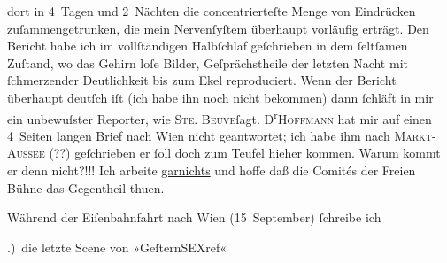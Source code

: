                dort in 4 Tagen und 2 Nächten die concentrierteſte Menge von Eindrücken
               zuſammengetrunken, die mein Nervenſyſtem überhaupt vorläufig erträgt. Den Bericht
               habe ich im vollſtändigen Halbſchlaf geſchrieben in dem{ }ſeltſamen Zuſtand, wo das
               Gehirn loſe Bilder, Geſprächstheile der letzten Nacht mit{ }ſchmerzender Deutlichkeit
               bis zum Ekel reproduciert. Wenn der Bericht überhaupt deutſch iſt (ich habe ihn noch
               nicht bekommen) dann{ }ſchläft in mir ein unbewuſster Reporter, \label{K_L00026-4v}\label{K_L00026-4} wie \textsc{Ste. Beuve}ſagt. D\textsuperscript{r}\textsc{Hoffmann} hat mir auf einen 4 Seiten langen Brief nach Wien nicht geantwortet; ich habe ihm nach {\pb}\textsc{Markt-Aussee} (??) geſchrieben er{ }ſoll doch zum Teufel hieher kommen. Warum kommt er denn
               nicht?!!! Ich arbeite \uline{garnichts} und hoffe daß die
               Comités der Freien Bühne das Gegentheil
               thuen.\pend
           
\pstart
           Während der Eiſenbahnfahrt nach Wien
                  (15 September){ }ſchreibe ich\pend
           
.) die letzte Scene von »GeſternSEXref«\pend
           

